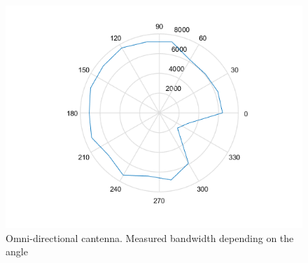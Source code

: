 \begin{figure}
\begin{center}
					\includegraphics[width=\figurewidth]{plots/polar_omni_b.png}
					\caption{Omni-directional cantenna. Measured bandwidth depending on the angle}
					\label{img:ang:band:omni}
				\end{center}\end{figure}